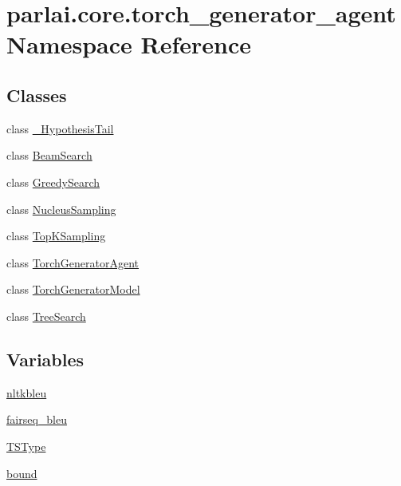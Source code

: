 \hypertarget{namespaceparlai_1_1core_1_1torch__generator__agent}{}\section{parlai.\+core.\+torch\+\_\+generator\+\_\+agent Namespace Reference}
\label{namespaceparlai_1_1core_1_1torch__generator__agent}
\subsection*{Classes}
\begin{DoxyCompactItemize}
\item 
class \hyperlink{classparlai_1_1core_1_1torch__generator__agent_1_1__HypothesisTail}{\+\_\+\+Hypothesis\+Tail}
\item 
class \hyperlink{classparlai_1_1core_1_1torch__generator__agent_1_1BeamSearch}{Beam\+Search}
\item 
class \hyperlink{classparlai_1_1core_1_1torch__generator__agent_1_1GreedySearch}{Greedy\+Search}
\item 
class \hyperlink{classparlai_1_1core_1_1torch__generator__agent_1_1NucleusSampling}{Nucleus\+Sampling}
\item 
class \hyperlink{classparlai_1_1core_1_1torch__generator__agent_1_1TopKSampling}{Top\+K\+Sampling}
\item 
class \hyperlink{classparlai_1_1core_1_1torch__generator__agent_1_1TorchGeneratorAgent}{Torch\+Generator\+Agent}
\item 
class \hyperlink{classparlai_1_1core_1_1torch__generator__agent_1_1TorchGeneratorModel}{Torch\+Generator\+Model}
\item 
class \hyperlink{classparlai_1_1core_1_1torch__generator__agent_1_1TreeSearch}{Tree\+Search}
\end{DoxyCompactItemize}
\subsection*{Variables}
\begin{DoxyCompactItemize}
\item 
\hyperlink{namespaceparlai_1_1core_1_1torch__generator__agent_aea7f35d1607db2e62074094e0d9265b8}{nltkbleu}
\item 
\hyperlink{namespaceparlai_1_1core_1_1torch__generator__agent_a5f0b5ef03b58d46f1b01efa07e919aac}{fairseq\+\_\+bleu}
\item 
\hyperlink{namespaceparlai_1_1core_1_1torch__generator__agent_a0526ff67eb4bc600cb8caa4a561ebb6f}{T\+S\+Type}
\item 
\hyperlink{namespaceparlai_1_1core_1_1torch__generator__agent_abff591d0c5746435fc2dba74d00d2d6c}{bound}
\end{DoxyCompactItemize}


